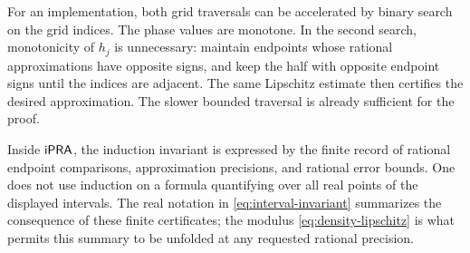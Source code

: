 For an implementation, both grid traversals can be accelerated by binary
search on the grid indices. The phase values are monotone. In the second
search, monotonicity of $h_j$ is unnecessary: maintain endpoints whose
rational approximations have opposite signs, and keep the half with opposite
endpoint signs until the indices are adjacent. The same Lipschitz estimate
then certifies the desired approximation. The slower bounded traversal is
already sufficient for the proof.

Inside $\mathsf{iPRA}$, the induction invariant is expressed by the finite record of
rational endpoint comparisons, approximation precisions, and rational error
bounds. One does not use induction on a formula quantifying over all real
points of the displayed intervals. The real notation in
\eqref{eq:interval-invariant} summarizes the consequence of these finite
certificates; the modulus \eqref{eq:density-lipschitz} is what permits this
summary to be unfolded at any requested rational precision.
